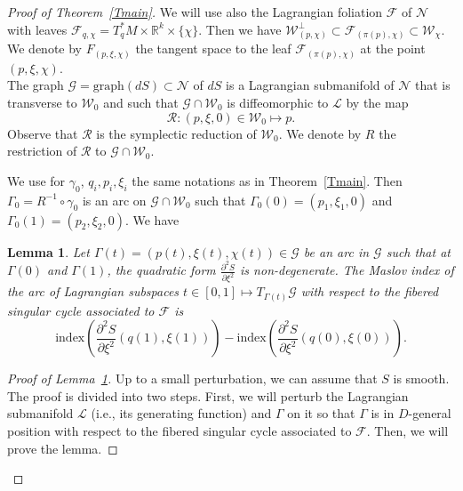 \documentclass[10pt,a4paper]{amsart}
\numberwithin{equation}{section}
\newcommand*\cF{\mathcal{F}}
\newcommand*\cg{\mathcal{G}}
\newcommand*\cl{\mathcal{L}}
\newcommand*\cN{\mathcal{N}}
\newcommand*\cR{\mathcal{R}}
\newcommand*\cw{\mathcal{W}}
\newcommand{\Graph}{\mathrm{graph}}
\newcommand*\R{\mathbb{R}}
\newtheorem{lemm}[theo]{Lemma}
\theoremstyle{definition}
\theoremstyle{remark}
\begin{document}
\begin{proof}[Proof of Theorem~\ref{Tmain}]
We will use also the Lagrangian foliation $\cF$ of $\cN$ with leaves $\cF_{q,\chi}=T^*_qM\times \R^k\times \{ \chi\}$. Then we have $\cw^\bot_{(p,\chi)} \subset \cF_{(\pi(p),\chi)}\subset \cw_\chi$. We denote by $F_{(p,\xi, \chi)}$ the tangent space to the leaf $\cF_{(\pi(p),\chi)}$ at the point $(p,\xi, \chi)$.\\
The graph $ \cg= \Graph(dS)\subset \cN$ of $dS$ is a Lagrangian submanifold of $\cN$ that is transverse to $\cw_0$ and such that $\cg\cap \cw_0$ is diffeomorphic to $\cl$ by the map
\[
\cR:(p, \xi, 0)\in \cw_0\mapsto p.
\]
Observe that $\cR$ is the symplectic reduction of $\cw_0$. We denote by $R$ the restriction of $\cR$ to $\cg\cap \cw_0$.

We use for $\gamma_0$, $q_i, p_i, \xi_i$ the same notations as in Theorem~\ref{Tmain}. Then $\Gamma_0=R^{-1}\circ \gamma_0$ is an arc on $\cg\cap \cw_0$ such that $\Gamma_0(0)=(p_1, \xi_1, 0)$ and $\Gamma_0 (1)=(p_2, \xi_2, 0)$. We have

\begin{lemm}\label{Lindices}
Let $\Gamma(t)=(p(t), \xi(t), \chi(t))\in \cg$ be an arc in $\cg$ such that at $\Gamma(0)$ and $\Gamma(1)$, the quadratic form $\frac{\partial^2 S}{\partial \xi^2}$ is non-degenerate. The Maslov index of the arc of Lagrangian subspaces $t\in[0, 1]\mapsto T_{\Gamma(t)}\cg$ with respect to the fibered singular cycle associated to $\cF$
is
\[
\text{index}\left(\frac{\partial^2 S}{\partial \xi^2}(q(1), \xi(1))\right)-\text{index}\left(\frac{\partial^2 S}{\partial \xi^2}(q(0), \xi(0))\right).
\]
\end{lemm}


\begin{proof}[Proof of Lemma~\ref{Lindices}]
Up to a small perturbation, we can assume that $S$ is smooth. The proof is divided into two steps. First, we will perturb the Lagrangian submanifold $\cl$ (i.e., its generating function) and $\Gamma$ on it so that $\Gamma$ is in $D$-general position with respect to the fibered singular cycle associated to $\cF$. Then, we will prove the lemma. 


\end{proof}
\end{proof}
\end{document}
